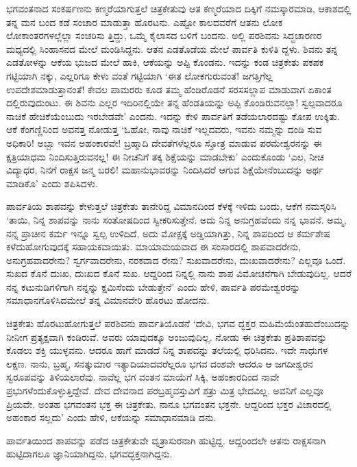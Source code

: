ಭಗವಂತನಾದ ಸಂಕರ್ಷಣನು ಕಣ್ಮರೆಯಾಗುತ್ತಲೆ ಚಿತ್ರಕೇತುವು ಆತ ಕಣ್ಮರೆಯಾದ ದಿಕ್ಕಿಗೆ ನಮಸ್ಕಾರಮಾಡಿ, ಆಕಾಶದಲ್ಲಿ ತನ್ನ ಮನ ಬಂದ ಕಡೆ ಸಂಚಾರ ಮಾಡುತ್ತಾ ಹೊರಟನು. ಎಷ್ಟೋ ಕಾಲದವರೆಗೆ ಆತನು ಲೋಕ ಲೋಕಾಂತರಗಳಲ್ಲೆಲ್ಲಾ ಸಂಚರಿಸು ತ್ತಿದ್ದು, ಒಮ್ಮೆ ಕೈಲಾಸದ ಬಳಿಗೆ ಬಂದನು. ಅಲ್ಲಿ ಪರಶಿವನು ಸಿದ್ಧಚಾರಣರ ಮಧ್ಯದಲ್ಲಿ ಸಿಂಹಾಸನದ ಮೇಲೆ ಮಂಡಿಸಿದ್ದನು. ಆತನ ಎಡತೊಡೆಯ ಮೇಲೆ ಪಾರ್ವತಿ ಕುಳಿತಿ ದ್ದಳು. ಶಿವನು ತನ್ನ ಎಡತೋಳನ್ನು ಆಕೆಯ ಭುಜದ ಮೇಲೆ ಹಾಕಿ, ಆಕೆಯನ್ನು ಅಪ್ಪಿ ಕೊಂಡನು. ಇದನ್ನು ಕಂಡ ಚಿತ್ರಕೇತು ಪಕಪಕ ಗಟ್ಟಿಯಾಗಿ ನಕ್ಕು, ಎಲ್ಲರಿಗೂ ಕೇಳು ವಂತೆ ಗಟ್ಟಿಯಾಗಿ ‘ಈತ ಲೋಕಗುರುವಂತೆ! ಜಗತ್ತಿಗೆಲ್ಲ ಉಪದೇಶಮಾಡುತ್ತಾನಂತೆ! ಕೇವಲ ಪಾಮರರು ಕೂಡ ತಮ್ಮ ಹೆಂಡಿರೊಡನೆ ಸರಸಸಲ್ಲಾಪ ಮಾಡುವಾಗ ಏಕಾಂತ ದಲ್ಲಿರುವುದುಂಟು. ಈ ಶಿವನು ಎಲ್ಲರ ಇದಿರಿನಲ್ಲಿಯೇ ತನ್ನ ಹೆಂಡತಿಯನ್ನು ಅಪ್ಪಿ ಕೊಂಡಿರುವನಲ್ಲಾ! ಸ್ವಲ್ಪವಾದರೂ ನಾಚಿಕೆ ಹೇಚಿಕೆಯೆಂಬುದು ಇರಬೇಡವೇ’ ಎಂದನು. ಇದನ್ನು ಕೇಳಿ ಪಾರ್ವತಿಗೆ ತಡೆಯಲಾರದಷ್ಟು ಕೋಪ ಉಕ್ಕಿತು. ಆಕೆ ಕೆಂಗಣ್ಣಿನಿಂದ ಅವನತ್ತ ನೋಡುತ್ತ ‘ಓಹೋ, ನಾವು ನಾಚಿಕೆ ಇಲ್ಲದವರು, ಇವನು ನಮ್ಮನ್ನು ದಂಡಿ ಸುವ ಅಧಿಕಾರಿ! ಅಬ್ಬಾ ಇವನ ಅಹಂಕಾರವೇ! ಬ್ರಹ್ಮಾದಿ ದೇವತೆಗಳೆಲ್ಲರೂ ಸ್ತೋತ್ರ ಮಾಡುವ ಪರಮೇಶ್ವರನನ್ನು ಈ ಕ್ಷತ್ರಿಯಾಧಮ ನಿಂದಿಸುತ್ತಿರುವನಲ್ಲ! ಈ ನೀಚನಿಗೆ ತಕ್ಕ ಶಿಕ್ಷೆಯನ್ನು ಮಾಡಬೇಕು’ ಎಂದುಕೊಂಡು ‘ಎಲ, ನೀಚ ವಿದ್ಯಾಧರ, ನಿನಗೆ ರಾಕ್ಷಸ ಜನ್ಮ ಬರಲಿ! ಮಹಾನುಭಾವರನ್ನು ನಿಂದಿಸಿದರೆ ಆಗುವ ಶಿಕ್ಷೆಯೇನೆಂಬುದನ್ನು ಅರ್ಥ ಮಾಡಿಕೊ’ ಎಂದು ಶಪಿಸಿದಳು. 

ಪಾರ್ವತಿಯ ಶಾಪವನ್ನು ಕೇಳುತ್ತಲೆ ಚಿತ್ರಕೇತು ತಾನೇರಿದ್ದ ವಿಮಾನದಿಂದ ಕೆಳಕ್ಕೆ ಇಳಿದು ಬಂದು, ಆಕೆಗೆ ನಮಸ್ಕರಿಸಿ ‘ತಾಯಿ, ನಿನ್ನ ಶಾಪವನ್ನು ನಾನು ಸಂತೋಷದಿಂದ ಸ್ವೀಕರಿಸುತ್ತೇನೆ. ಅದು ನಿನ್ನ ಅನುಗ್ರಹವೆಂದು ನನ್ನ ಭಾವನೆ. ಅಮ್ಮ, ನನ್ನ ಪ್ರಾಚೀನ ಕರ್ಮ ಇನ್ನೂ ಸ್ವಲ್ಪ ಉಳಿದಿದೆ, ಅದು ಮೋಕ್ಷಕ್ಕೆ ಅಡ್ಡಿಯಾಗಿತ್ತು, ನಿನ್ನ ಶಾಪದಿಂದ ಆ ಕರ್ಮಶೇಷ ಕಳೆದುಹೋಗುವುದಕ್ಕೆ ಸಹಾಯಕವಾಯಿತು. ಮಾಯಾಮಯವಾದ ಈ ಸಂಸಾರದಲ್ಲಿ ಶಾಪವಾದರೇನು, ಅನುಗ್ರಹವಾದರೇನು? ಸ್ವರ್ಗವಾದರೇನು, ನರಕವಾದ ರೇನು? ಸುಖವಾದರೇನು, ದುಃಖವಾದರೇನು? ಎಲ್ಲವೂ ಒಂದೆ. ಸುಖದ ಕೊನೆ ದುಃಖ, ದುಃಖದ ಕೊನೆ ಸುಖ. ಆದ್ದರಿಂದ ನಿನ್ನಲ್ಲಿ ನಾನು ಶಾಪ ವಿಮೋಚನೆಗಾಗಿ ಬೇಡುವುದಿಲ್ಲ. ಆದರೆ ನನ್ನ ಕಟುನುಡಿಗಳಿಗಾಗಿ ನನ್ನನ್ನು ಕ್ಷಮಿಸೆಂದು ಬೇಡುತ್ತೇನೆ’ ಎಂದು ಹೇಳಿ, ಪಾರ್ವತಿ ಪರಮೇಶ್ವರರನ್ನು ಸಮಾಧಾನಗೊಳಿಸಿದಮೇಲೆ ತನ್ನ ವಿಮಾನವೇರಿ ಹೊರಟು ಹೋದನು.

ಚಿತ್ರಕೇತು ಹೊರಟುಹೋಗುತ್ತಲೆ ಪರಶಿವನು ಪಾರ್ವತಿಯೊಡನೆ ‘ದೇವಿ, ಭಗವ ದ್ಭಕ್ತರ ಮಹಿಮೆಯೆಂತಹುದೆಂಬುದನ್ನು ನೀನೀಗ ಪ್ರತ್ಯಕ್ಷವಾಗಿ ಕಂಡಿರುವೆ. ಅವರು ಯಾವುದಕ್ಕೂ ಅಂಜುವುದಿಲ್ಲ. ನೋಡು ಈ ಚಿತ್ರಕೇತು ಪ್ರತಿಶಾಪವನ್ನು ಕೊಡಲು ಶಕ್ತಿ ಯುಳ್ಳವನು. ಆದರೂ ಹಾಗೆ ಮಾಡದೆ ನಿನ್ನ ಶಾಪವನ್ನು ತಲೆಯಲ್ಲಿ ಧರಿಸಿದನು. ಇದೇ ಸಾಧುಗಳ ಲಕ್ಷಣ. ನಾನು, ಬ್ರಹ್ಮ, ಸನತ್ಕುಮಾರ ಇತ್ಯಾದಿಯಾದವರೆಲ್ಲರೂ ಭಗವ ದಂಶವೇ ಆದರೂ ಆ ಜಗದೀಶ್ವರನ ಸ್ವರೂಪವನ್ನು ತಿಳಿಯಲಾರೆವು. ನಾವೆಲ್ಲ ಭಗ ವಂತನ ಮಾಯೆಗೆ ಸಿಕ್ಕಿ, ಅಹಂಕಾರದಿಂದ ನಾವೇ ಪ್ರಭುಗಳೆಂದುಕೊಳ್ಳುತ್ತಿದ್ದೇವೆ. ದೇವ ದೇವನಾದ ಪರಬ್ರಹ್ಮವಸ್ತುವಿಗೆ ಶತ್ರು ಮಿತ್ರ ಭೇದವಿಲ್ಲ. ಅವನಿಗೆ ಎಲ್ಲವೂ ಪ್ರಿಯವೇ. ಅಂತಹ ಭಗವಂತನ ಭಕ್ತ ಈ ಚಿತ್ರಕೇತು. ನಾನೂ ಭಗವಂತನ ಭಕ್ತನೇ. ಆದ್ದರಿಂದ ಭಕ್ತರ ವಿಚಾರದಲ್ಲಿ ಅಹಂಕಾರ ಸಲ್ಲದು’ ಎಂದು ಹೇಳಿ, ಆಕೆಯನ್ನು ಸಮಾಧಾನಮಾಡಿ ದನು. 

ಪಾರ್ವತಿಯಿಂದ ಶಾಪವನ್ನು ಪಡೆದ ಚಿತ್ರಕೇತುವೇ ವೃತ್ರಾಸುರನಾಗಿ ಹುಟ್ಟಿದ್ದ. ಆದ್ದರಿಂದಲೇ ಆತನು ರಾಕ್ಷಸನಾಗಿ ಹುಟ್ಟಿದಾಗಲೂ ಜ್ಞಾನಿಯಾಗಿದ್ದನು, ಭಗವದ್ಭಕ್ತನಾಗಿದ್ದನು.

